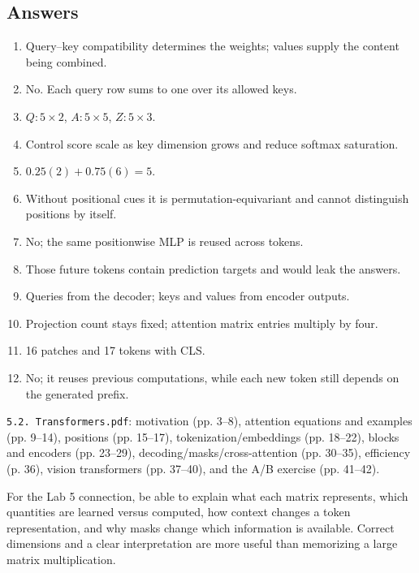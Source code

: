 \documentclass[11pt]{article}
\begin{document}
\subsection{Answers}
\begin{enumerate}
\item Query--key compatibility determines the weights; values supply the content being combined.
\item No. Each query row sums to one over its allowed keys.
\item $Q:5\times2$, $A:5\times5$, $Z:5\times3$.
\item Control score scale as key dimension grows and reduce softmax saturation.
\item $0.25(2)+0.75(6)=5$.
\item Without positional cues it is permutation-equivariant and cannot distinguish positions by itself.
\item No; the same positionwise MLP is reused across tokens.
\item Those future tokens contain prediction targets and would leak the answers.
\item Queries from the decoder; keys and values from encoder outputs.
\item Projection count stays fixed; attention matrix entries multiply by four.
\item 16 patches and 17 tokens with CLS.
\item No; it reuses previous computations, while each new token still depends on the generated prefix.
\end{enumerate}

\texttt{5.2. Transformers.pdf}: motivation (pp. 3--8), attention equations and examples (pp. 9--14), positions (pp. 15--17), tokenization/embeddings (pp. 18--22), blocks and encoders (pp. 23--29), decoding/masks/cross-attention (pp. 30--35), efficiency (p. 36), vision transformers (pp. 37--40), and the A/B exercise (pp. 41--42).

For the Lab 5 connection, be able to explain what each matrix represents, which quantities are learned versus computed, how context changes a token representation, and why masks change which information is available. Correct dimensions and a clear interpretation are more useful than memorizing a large matrix multiplication.
\end{document}
